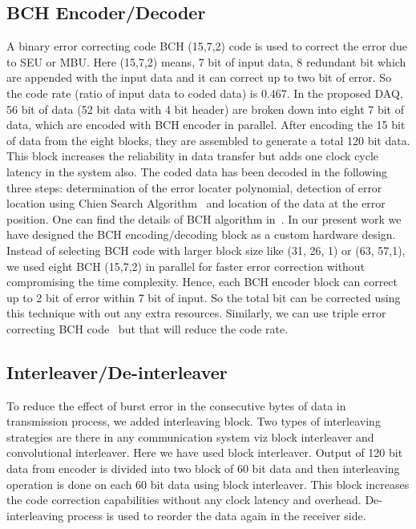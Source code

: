 \documentclass[a4paper]{jpconf}
\begin{document}
\subsection{BCH Encoder/Decoder}A binary error correcting code BCH (15,7,2) code is used to correct the error due to SEU or MBU. Here (15,7,2) means, 7 bit of input data, 8 redundant bit which are appended with the input data and it can correct up to two bit of error. So the code rate (ratio of input data to coded data) is 0.467. In the proposed DAQ, 56 bit of data (52 bit data with 4 bit header) are broken down into eight 7 bit of data, which are encoded with BCH encoder in parallel. After encoding the 15 bit of data from the eight blocks, they are assembled to generate a total 120 bit data. This block increases the reliability in data transfer but adds one clock cycle latency in the system also. The coded data has been decoded in the following three steps: determination of the error locater polynomial, detection of error location using Chien Search Algorithm~\cite{chien:search} and location of the data at the error position. One can find the details of BCH algorithm in~\cite{chien:search}. In our present work we have designed the BCH encoding/decoding block as a custom hardware design. Instead of selecting BCH code with larger block size like (31, 26, 1) or (63, 57,1), we used eight BCH (15,7,2) in parallel for faster error correction without compromising the time complexity. Hence, each BCH encoder block can correct up to 2 bit of error within 7 bit of input. So the total    bit can be corrected using this technique with out any extra resources. Similarly, we can use triple error correcting BCH code~\cite{chien:search} but that will reduce the code rate.
\vspace{-1 pc}
\subsection{Interleaver/De-interleaver}To reduce the effect of burst error in the consecutive bytes of data in transmission process, we added interleaving block. Two types of interleaving strategies are there in any communication system viz block interleaver and convolutional interleaver. Here we have used block interleaver. Output of 120 bit data from encoder is divided into two block of 60 bit data and then interleaving operation is done on each 60 bit data using block interleaver. This block increases the code correction capabilities without any clock latency and overhead. De-interleaving process is used to reorder the data again in the receiver side.
\vspace{-1 pc}
\end{document}
